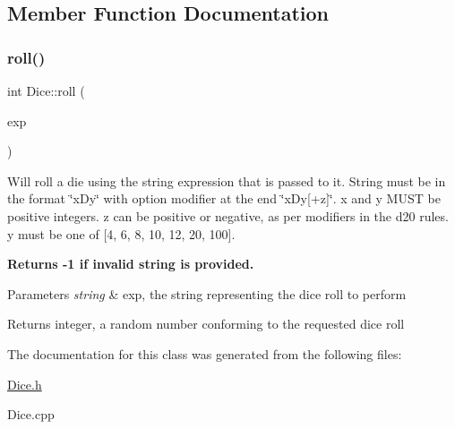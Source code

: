 \subsection{Member Function Documentation}
\hypertarget{class_dice_a0bc8f4b697804af0785f34b801cd6feb}{}\label{class_dice_a0bc8f4b697804af0785f34b801cd6feb} 
\subsubsection{\texorpdfstring{roll()}{roll()}}
{\footnotesize\ttfamily int Dice\+::roll (\begin{DoxyParamCaption}\item[{std\+::string}]{exp }\end{DoxyParamCaption})}

Will \textquotesingle{}roll\textquotesingle{} a die using the string expression that is passed to it. String must be in the format \char`\"{}x\+Dy\char`\"{} with option modifier at the end \char`\"{}x\+Dy\mbox{[}+z\mbox{]}\char`\"{}. x and y M\+U\+ST be positive integers. z can be positive or negative, as per modifiers in the d20 rules. y must be one of \mbox{[}4, 6, 8, 10, 12, 20, 100\mbox{]}.

{\bfseries Returns -\/1 if invalid string is provided.}

{\bfseries 
\begin{DoxyParams}{Parameters}
{\em string} & exp, the string representing the dice roll to perform \\
\hline
\end{DoxyParams}
\begin{DoxyReturn}{Returns}
integer, a random number conforming to the requested dice roll 
\end{DoxyReturn}
}

The documentation for this class was generated from the following files\+:\begin{DoxyCompactItemize}
\item 
\hyperlink{_dice_8h}{Dice.\+h}\item 
Dice.\+cpp\end{DoxyCompactItemize}
